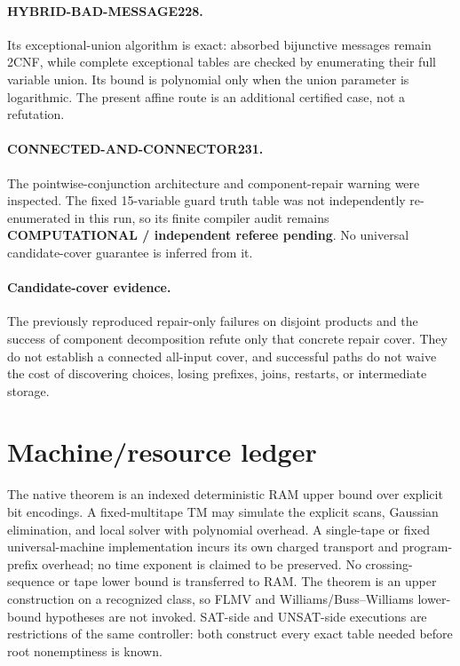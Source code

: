\documentclass[11pt]{article}
\begin{document}
\paragraph{HYBRID-BAD-MESSAGE228.}
Its exceptional-union algorithm is exact: absorbed bijunctive messages remain
2CNF, while complete exceptional tables are checked by enumerating their full
variable union.  Its bound is polynomial only when the union parameter is
logarithmic.  The present affine route is an additional certified case, not a
refutation.

\paragraph{CONNECTED-AND-CONNECTOR231.}
The pointwise-conjunction architecture and component-repair warning were
inspected.  The fixed 15-variable guard truth table was not independently
re-enumerated in this run, so its finite compiler audit remains
\textbf{COMPUTATIONAL / independent referee pending}.  No universal
candidate-cover guarantee is inferred from it.

\paragraph{Candidate-cover evidence.}
The previously reproduced repair-only failures on disjoint products and the
success of component decomposition refute only that concrete repair cover.
They do not establish a connected all-input cover, and successful paths do
not waive the cost of discovering choices, losing prefixes, joins, restarts,
or intermediate storage.

\section{Machine/resource ledger}
The native theorem is an indexed deterministic RAM upper bound over explicit
bit encodings.  A fixed-multitape TM may simulate the explicit scans,
Gaussian elimination, and local solver with polynomial overhead.  A
single-tape or fixed universal-machine implementation incurs its own charged
transport and program-prefix overhead; no time exponent is claimed to be
preserved.  No crossing-sequence or tape lower bound is transferred to RAM.
The theorem is an upper construction on a recognized class, so FLMV and
Williams/Buss--Williams lower-bound hypotheses are not invoked.  SAT-side
and UNSAT-side executions are restrictions of the same controller: both
construct every exact table needed before root nonemptiness is known.
\end{document}
